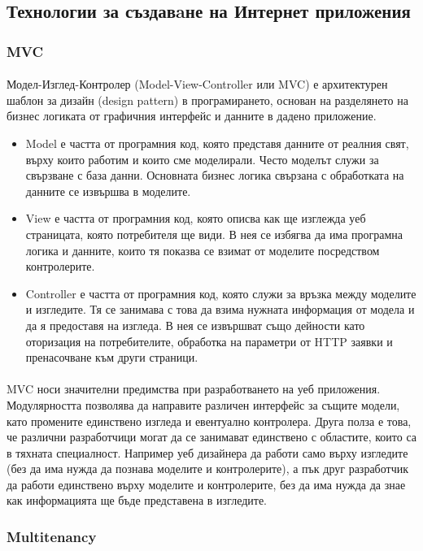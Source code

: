 \documentclass[pdftex,14pt,a4paper]{extreport}
\begin{document}
\subsection {Технологии за създавaне на Интернет приложения}
\subsubsection {MVC}
\paragraph {}
Модел-Изглед-Контролер (Model-View-Controller или MVC) е архитектурен шаблон за дизайн (design pattern) в програмирането, основан на разделянето на бизнес логиката от графичния интерфейс и данните в дадено приложение.
\begin{itemize}
  \item Model е частта от програмния код, която представя данните от реалния свят, върху които работим и които сме моделирали. Често моделът служи за свързване с база данни. Основната бизнес логика свързана с обработката на данните се извършва в моделите.
  \item View е частта от програмния код, която описва как ще изглежда уеб страницата, която потребителя ще види. В нея се избягва да има програмна логика и данните, които тя показва се взимат от моделите посредством контролерите.
  \item Controller е частта от програмния код, която служи за връзка между моделите и изгледите. Тя се занимава с това да взима нужната информация от модела и да я предоставя на изгледа. В нея се извършват също дейности като оторизация на потребителите, обработка на параметри от HTTP заявки и пренасочване към други страници.
\end{itemize}
\paragraph {}
MVC носи значителни предимства при разработването на уеб приложения. Модулярността позволява да направите различен интерфейс за същите модели, като промените единствено изгледа и евентуално контролера. Друга полза е това, че различни разработчици могат да се занимават единствено с областите, които са в тяхната специалност. Например уеб дизайнера да работи само върху изгледите (без да има нужда да познава моделите и контролерите), а пък друг разработчик да работи единствено върху моделите и контролерите, без да има нужда да знае как информацията ще бъде представена в изгледите.
\subsubsection {Multitenancy}
\end{document}
